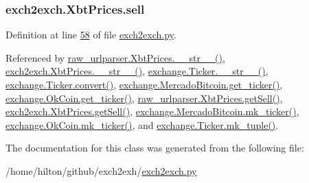 \subsubsection[{\texorpdfstring{sell}{sell}}]{\setlength{\rightskip}{0pt plus 5cm}exch2exch.\+Xbt\+Prices.\+sell}\hypertarget{classexch2exch_1_1_xbt_prices_a06fd0cfb03d485af3364a0d86fbe5385}{}\label{classexch2exch_1_1_xbt_prices_a06fd0cfb03d485af3364a0d86fbe5385}


Definition at line \hyperlink{exch2exch_8py_source_l00058}{58} of file \hyperlink{exch2exch_8py_source}{exch2exch.\+py}.



Referenced by \hyperlink{raw__urlparser_8py_source_l00074}{raw\+\_\+urlparser.\+Xbt\+Prices.\+\_\+\+\_\+str\+\_\+\+\_\+()}, \hyperlink{exch2exch_8py_source_l00091}{exch2exch.\+Xbt\+Prices.\+\_\+\+\_\+str\+\_\+\+\_\+()}, \hyperlink{exchange_8py_source_l00099}{exchange.\+Ticker.\+\_\+\+\_\+str\+\_\+\+\_\+()}, \hyperlink{exchange_8py_source_l00055}{exchange.\+Ticker.\+convert()}, \hyperlink{exchange_8py_source_l00306}{exchange.\+Mercado\+Bitcoin.\+get\+\_\+ticker()}, \hyperlink{exchange_8py_source_l00371}{exchange.\+Ok\+Coin.\+get\+\_\+ticker()}, \hyperlink{raw__urlparser_8py_source_l00065}{raw\+\_\+urlparser.\+Xbt\+Prices.\+get\+Sell()}, \hyperlink{exch2exch_8py_source_l00073}{exch2exch.\+Xbt\+Prices.\+get\+Sell()}, \hyperlink{exchange_8py_source_l00320}{exchange.\+Mercado\+Bitcoin.\+mk\+\_\+ticker()}, \hyperlink{exchange_8py_source_l00385}{exchange.\+Ok\+Coin.\+mk\+\_\+ticker()}, and \hyperlink{exchange_8py_source_l00084}{exchange.\+Ticker.\+mk\+\_\+tuple()}.



The documentation for this class was generated from the following file\+:\begin{DoxyCompactItemize}
\item 
/home/hilton/github/exch2exh/\hyperlink{exch2exch_8py}{exch2exch.\+py}\end{DoxyCompactItemize}
